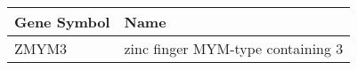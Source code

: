 \begin{tabular}{ll}
\toprule
Gene Symbol &                              Name \\
\midrule
      ZMYM3 & zinc finger MYM-type containing 3 \\
\bottomrule
\end{tabular}
